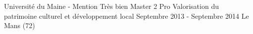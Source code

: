 

\begin{cventries}

  \cventry
        {Université du Maine - Mention Très bien} %
    {Master 2 Pro Valorisation du patrimoine culturel et développement local} %
    {Septembre 2013 - Septembre 2014} %
    {Le Mans (72)} %
    {
      \begin{cvitems} %
      \end{cvitems}
    }


\end{cventries}
